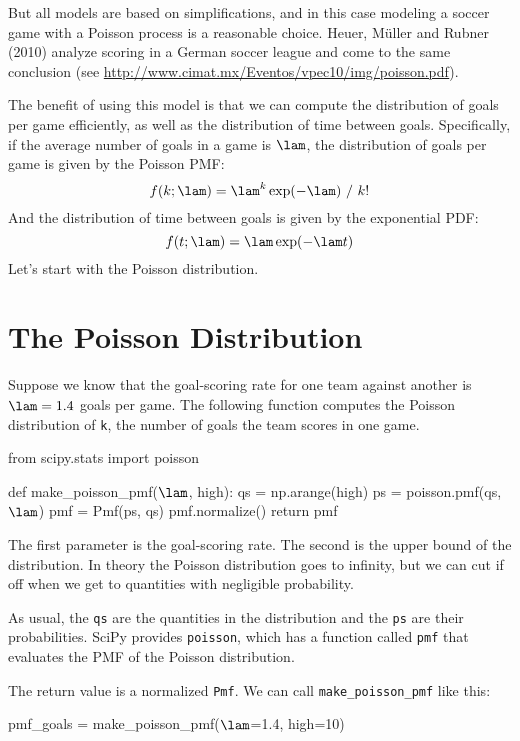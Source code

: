 \documentclass[12pt]{book}
\theoremstyle{exercise}
\newcommand{\py}[1]{{\tt #1}}%
\begin{document}
But all models are based on simplifications, and in this case modeling
a soccer game with a Poisson process is a reasonable choice.  Heuer,
M\"{u}ller and Rubner (2010) analyze scoring in a German soccer league
and come to the same conclusion (see
\url{http://www.cimat.mx/Eventos/vpec10/img/poisson.pdf}).

The benefit of using this model is that we can compute the distribution
of goals per game efficiently, as well as the distribution of time
between goals.  Specifically, if the average number of goals
in a game is $\lam$, the distribution of goals per game is
given by the Poisson PMF:
%
\[ f(k; \lam) = \lam^k \exp(-\lam) ~/~ k! \]
%
And the distribution of time between goals is given by the
exponential PDF:
%
\[ f(t; \lam) = \lam \exp(-\lam t) \]
%
Let's start with the Poisson distribution.


\section{The Poisson Distribution}

Suppose we know that the goal-scoring rate for one team against another is $\lam = 1.4$ goals per game.
The following function computes the Poisson distribution of \py{k}, the number of goals the team scores in one game.

\begin{code}
from scipy.stats import poisson

def make_poisson_pmf($\lam$, high):
    qs = np.arange(high)
    ps = poisson.pmf(qs, $\lam$)
    pmf = Pmf(ps, qs)
    pmf.normalize()
    return pmf
\end{code}

The first parameter is the goal-scoring rate.
The second is the upper bound of the distribution.
In theory the Poisson distribution goes to infinity, but we can cut if off when we get to quantities with negligible probability.

As usual, the \py{qs} are the quantities in the distribution and the \py{ps} are their probabilities.
SciPy provides \py{poisson}, which has a function called \py{pmf} that evaluates the PMF of the Poisson distribution.

The return value is a normalized \py{Pmf}.
We can call \py{make_poisson_pmf} like this:

\begin{code}
pmf_goals = make_poisson_pmf($\lam$=1.4, high=10)
\end{code}
\end{document}
